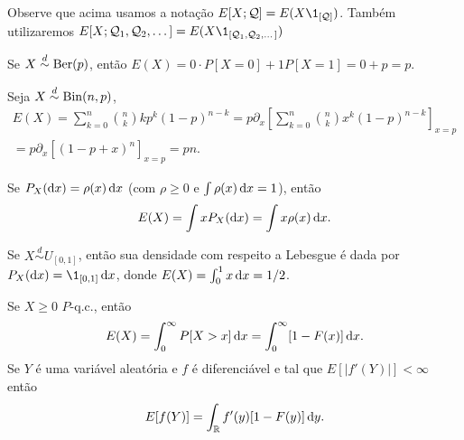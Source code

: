 Observe que acima usamos a notação $E[X; \mathcal{Q}] = E(X \1_{[\mathcal{Q}]})$.
Também utilizaremos $E[X; \mathcal{Q}_1, \mathcal{Q}_2, \dots] = E(X \1_{[\mathcal{Q}_1, \mathcal{Q}_2, \dots]})$

\begin{example}
  Se $X \overset{d}\sim \operatorname{Ber}(p)$, então $E(X) = 0 \cdot P[X = 0] + 1 P[X = 1] = 0 + p = p$.
\end{example}

\begin{example}
  Seja $X \overset{d}\sim \operatorname{Bin}(n,p)$,
  \begin{multline}
    E(X) = \sum_{k=0}^n\binom{n}{k}   k p^k(1-p)^{n-k}= p\partial_x \left[\sum_{k=0}^n\binom{n}{k}  x^k(1-p)^{n-k} \right]_{x=p}
    \\= p \partial_x \left[ (1-p+x)^n \right]_{x=p}=pn.
  \end{multline}
\end{example}

\begin{example}
Se $P_X(\mathop{}\!\mathrm{d} x) = \rho(x) \mathop{}\!\mathrm{d} x$ (com $\rho \geq 0$ e $\int \rho(x) \mathop{}\!\mathrm{d} x = 1$), então
\begin{equation}
  E(X) = \int x  P_X(\mathop{}\!\mathrm{d} x) = \int x \rho(x) \mathop{}\!\mathrm{d} x.
\end{equation}
\end{example}

\begin{example}
  Se $X \overset{d}\sim U_{[0,1]}$, então sua densidade com respeito a Lebesgue é dada por
  $P_X(\d x) = \1_{[0,1]} \d x$, donde $E(X) = \int_0^1 x \mathop{}\!\mathrm{d} x = 1/2$.
\end{example}

\begin{proposition}
  \label{p:espera_acumulada}
  Se $X \geq 0$ $P$-q.c., então
  \begin{equation}
    E(X) = \int_0^\infty P[X > x] \mathop{}\!\mathrm{d} x = \int_0^\infty [1 - F(x)] \mathop{}\!\mathrm{d} x .
  \end{equation}
  Se $Y$ é uma variável aleatória e $f$ é diferenciável e tal que $E[|f'(Y)|] < \infty$ então
    \begin{equation}
    E[f(Y)] = \int_{\mathbb R} f'(y) [1 - F(y)] \mathop{}\!\mathrm{d} y.
  \end{equation}
\end{proposition}

